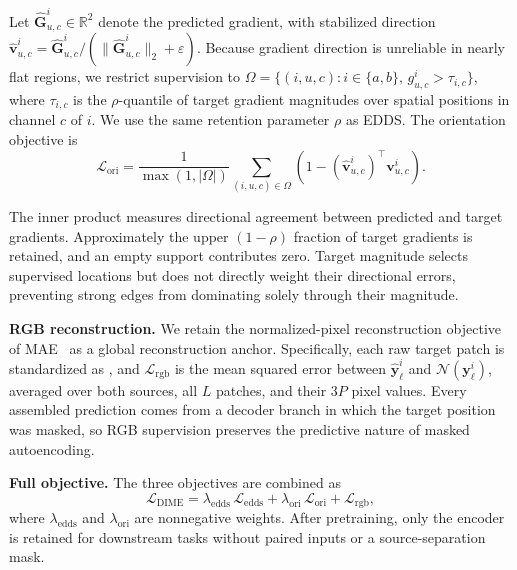 \documentclass[10pt,journal,compsoc]{IEEEtran}
\begin{document}
Let $\hat{\mathbf{G}}^{i}_{u,c}\in\mathbb{R}^{2}$ denote the predicted gradient, with stabilized direction
$\hat{\mathbf{v}}^{i}_{u,c}
=
\hat{\mathbf{G}}^{i}_{u,c}/
(\|\hat{\mathbf{G}}^{i}_{u,c}\|_{2}+\varepsilon)$.
Because gradient direction is unreliable in nearly flat regions, we restrict supervision to
$\Omega=\{(i,u,c):i\in\{a,b\},\,
g^{i}_{u,c}>\tau_{i,c}\}$,
where $\tau_{i,c}$ is the $\rho$-quantile of target gradient magnitudes over spatial positions in channel $c$ of $i$. We use the same retention parameter $\rho$ as EDDS. The orientation objective is
\begin{equation}
\mathcal{L}_{\mathrm{ori}}
=
\frac{1}{\max(1,|\Omega|)}
\sum_{(i,u,c)\in\Omega}
\left(
1-
(\hat{\mathbf{v}}^{i}_{u,c})^{\top}
\mathbf{v}^{i}_{u,c}
\right).
\label{eq:dime_orientation_loss}
\end{equation}

The inner product measures directional agreement between predicted and target gradients. Approximately the upper $(1-\rho)$ fraction of target gradients is retained, and an empty support contributes zero. Target magnitude selects supervised locations but does not directly weight their directional errors, preventing strong edges from dominating solely through their magnitude.

\noindent\textbf{RGB reconstruction.}
We retain the normalized-pixel reconstruction objective of MAE~\cite{he2022masked} as a global reconstruction anchor. Specifically, each raw target patch is standardized as , and $\mathcal{L}_{\mathrm{rgb}}$ is the mean squared error between $\hat{\mathbf{y}}^{i}_{\ell}$ and $\mathcal{N}(\mathbf{y}^{i}_{\ell})$, averaged over both sources, all $L$ patches, and their $3P$ pixel values. Every assembled prediction comes from a decoder branch in which the target position was masked, so RGB supervision preserves the predictive nature of masked autoencoding.

\noindent\textbf{Full objective.} The three objectives are combined as
\begin{equation}
\mathcal{L}_{\mathrm{DIME}}
=
\lambda_{\mathrm{edds}}\,\mathcal{L}_{\mathrm{edds}}
+
\lambda_{\mathrm{ori}}\,\mathcal{L}_{\mathrm{ori}}
+
\mathcal{L}_{\mathrm{rgb}},
\label{eq:dime_total_objective}
\end{equation}
where $\lambda_{\mathrm{edds}}$ and $\lambda_{\mathrm{ori}}$ are nonnegative weights. After pretraining, only the encoder is retained for downstream tasks without paired inputs or a source-separation mask.
\end{document}
